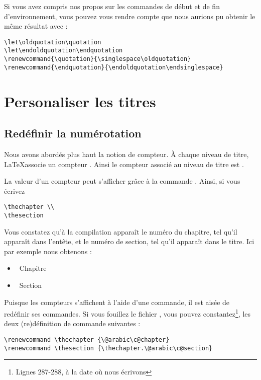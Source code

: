 \begin{anedocte}
Si vous avez compris nos propos sur les commandes de début et de fin d'environnement, vous pouvez vous rendre compte que nous aurions pu obtenir le même résultat avec :
\begin{verbatim}
\let\oldquotation\quotation
\let\endoldquotation\endquotation
\renewcommand{\quotation}{\singlespace\oldquotation}
\renewcommand{\endquotation}{\endoldquotation\endsinglespace}
\end{verbatim}
\end{anedocte}

\section{Personaliser les titres}

\subsection{Redéfinir la numérotation}
Nous avons abordés plus haut la notion de compteur. À chaque niveau de titre, \LaTeX associe un compteur . Ainsi le compteur associé au niveau de titre  est .

La valeur d'un compteur peut s'afficher grâce à la commande . Ainsi, si vous écrivez 
\begin{verbatim}
\thechapter \\
\thesection
\end{verbatim}

Vous constatez qu'à la compilation apparaît le numéro du chapitre, tel qu'il apparaît dans l'entête, et le numéro de section, tel qu'il apparaît dans le titre. Ici par exemple nous obtenons :


\begin{itemize}
\item\thechapter~Chapitre 
\item\thesection~Section
\end{itemize}


Puisque les compteurs s'affichent à l'aide d'une commande, il est aisée de redéfinir ses commandes. Si vous fouillez le fichier , vous pouvez constantez\footnote{Lignes 287-288, à la date où nous écrivons}, les deux (re)définition de commande suivantes :

\begin{verbatim}
\renewcommand \thechapter {\@arabic\c@chapter}
\renewcommand \thesection {\thechapter.\@arabic\c@section}
\end{verbatim}

